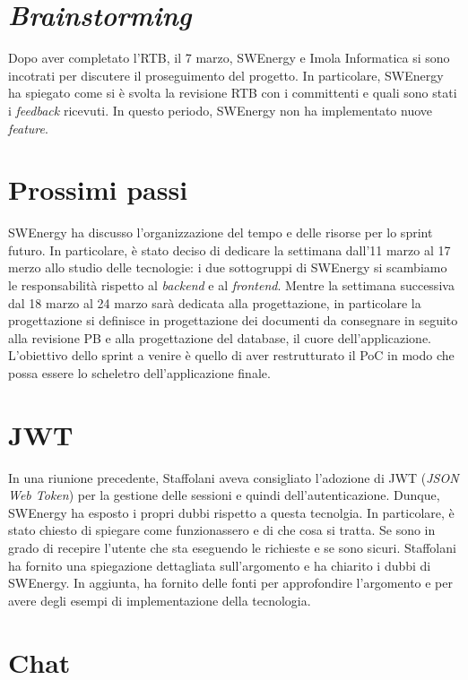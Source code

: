 \section{\textit{Brainstorming}}

Dopo aver completato l'RTB, il 7 marzo, SWEnergy e Imola Informatica si sono
incotrati per discutere il proseguimento del progetto. In particolare, SWEnergy
ha spiegato come si è svolta la revisione RTB con i committenti e quali sono
stati i \textit{feedback} ricevuti. In questo periodo, SWEnergy non ha
implementato nuove \textit{feature}.

\section{Prossimi passi}

SWEnergy ha discusso l'organizzazione del tempo e delle risorse per lo sprint
futuro. In particolare, è stato deciso di dedicare la settimana dall'11 marzo al
17 merzo allo studio delle tecnologie: i due sottogruppi di SWEnergy si
scambiamo le responsabilità rispetto al \textit{backend} e al \textit{frontend}.
Mentre la settimana successiva dal 18 marzo al 24 marzo sarà dedicata alla
progettazione, in particolare la progettazione si definisce in progettazione dei
documenti da consegnare in seguito alla revisione PB e alla progettazione del
database, il cuore dell'applicazione. L'obiettivo dello sprint a venire è quello
di aver restrutturato il PoC in modo che possa essere lo scheletro 
dell'applicazione finale.

\section{JWT}

In una riunione precedente, Staffolani aveva consigliato l'adozione di JWT
(\textit{JSON Web Token}) per la gestione delle sessioni e quindi
dell'autenticazione. Dunque, SWEnergy ha esposto i propri dubbi rispetto a
questa tecnolgia. In particolare, è stato chiesto di spiegare come funzionassero
e di che cosa si tratta. Se sono in grado di recepire l'utente che sta eseguendo
le richieste e se sono sicuri. Staffolani ha fornito una spiegazione dettagliata
sull'argomento e ha chiarito i dubbi di SWEnergy. In aggiunta, ha fornito delle
fonti per approfondire l'argomento e per avere degli esempi di implementazione
della tecnologia.

\section{Chat}

